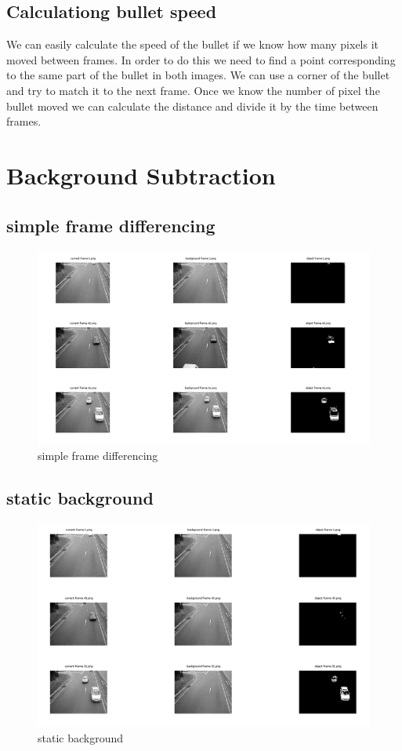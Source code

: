 \documentclass{article}
\begin{document}
	\subsection{Calculationg bullet speed}
	We can easily calculate the speed of the bullet if we know how many pixels it moved between frames. In order to do this we need to find a point corresponding to the same part of the bullet in both images. We can use a corner of the bullet and try to match it to the next frame. Once we know the number of pixel the bullet moved we can calculate the distance and divide it by the time between frames.
	
	
	\section{Background Subtraction}
	
	\subsection{simple frame differencing}
	\begin{figure}[H]
		\includegraphics[width=\linewidth]{Q2/partA/partA.png}
		\caption{simple frame differencing}
	\end{figure}
	
	\newpage
	\subsection{static background}
	\begin{figure}[H]
		\includegraphics[width=\linewidth]{Q2/partB/partB.png}
		\caption{static background}
	\end{figure}
	
\end{document}
